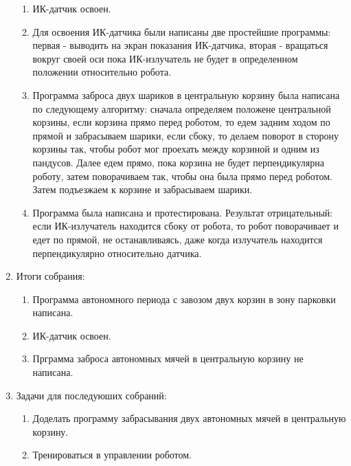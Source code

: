\begin{enumerate}
\begin{enumerate}
		\item ИК-датчик освоен.
		
		\item Для освоения ИК-датчика были написаны две простейшие программы: первая - выводить на экран показания ИК-датчика, вторая - вращаться вокруг своей оси пока ИК-излучатель не будет в определенном положении относительно робота.  
		
		\item Программа заброса двух шариков в центральную корзину была написана по следующему алгоритму: сначала определяем положене центральной корзины, если корзина прямо перед роботом, то едем задним ходом по прямой и забрасываем шарики, если сбоку, то делаем поворот в сторону корзины так, чтобы робот мог проехать между корзиной и одним из пандусов. Далее едем прямо, пока корзина не будет перпендикулярна роботу, затем поворачиваем так, чтобы она была прямо перед роботом. Затем подъезжаем к корзине и забрасываем шарики.
		
		\item Программа была написана и протестирована. Результат отрицательный: если ИК-излучатель находится сбоку от робота, то робот поворачивает и едет по прямой, не останавливаясь, даже когда излучатель находится перпендикулярно относительно датчика.   
	\end{enumerate}
	\item Итоги собрания:
	\begin{enumerate}
		\item Программа автономного периода с завозом двух корзин в зону парковки написана.
		
		\item ИК-датчик освоен.
		
		\item Прграмма заброса автономных мячей в центральную корзину не написана.
	\end{enumerate}
	\item Задачи для последуюших собраний:
	\begin{enumerate}
		\item Доделать программу забрасывания двух автономных мячей в центральную корзину.
		
		\item Тренироваться в управлении роботом.
	\end{enumerate}
\end{enumerate}
\fillpage